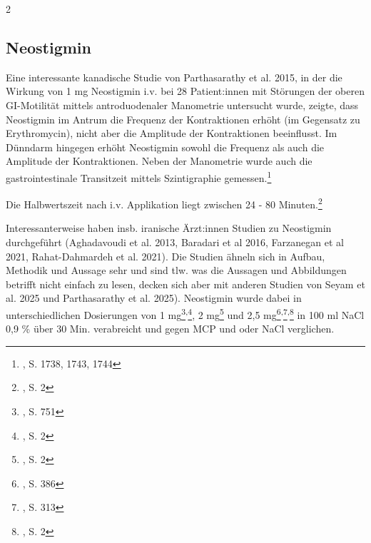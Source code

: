 \documentclass{article}
\begin{document}
\begin{multicols}{2}

  \subsection{Neostigmin}%
  \label{sub:Neostigmin}

  Eine interessante kanadische Studie von Parthasarathy et al. 2015, in der die Wirkung von 1 mg Neostigmin i.v. bei 28 Patient:innen mit Störungen der oberen GI-Motilität mittels antroduodenaler Manometrie untersucht wurde, zeigte, dass Neostigmin im Antrum die Frequenz der Kontraktionen erhöht (im Gegensatz zu Erythromycin), nicht aber die Amplitude der Kontraktionen beeinflusst. Im Dünndarm hingegen erhöht Neostigmin sowohl die Frequenz als auch die Amplitude der Kontraktionen. Neben der Manometrie wurde auch die gastrointestinale Transitzeit mittels Szintigraphie gemessen.\footnote{\cite{parthasarathy2015EffectNeostigmineGastroduodenal}, S. 1738, 1743, 1744}

  Die Halbwertszeit nach i.v. Applikation liegt zwischen 24 - 80 Minuten.\footnote{\cite{NeostigCarinopharm05Mga}, S. 2}

  Interessanterweise haben insb. iranische Ärzt:innen Studien zu Neostigmin durchgeführt (Aghadavoudi et al. 2013, Baradari et al 2016, Farzanegan et al 2021, Rahat-Dahmardeh et al. 2021). Die Studien ähneln sich in Aufbau, Methodik und Aussage sehr und sind tlw. was die Aussagen und Abbildungen betrifft nicht einfach zu lesen, decken sich aber mit anderen Studien von Seyam et al. 2025 und Parthasarathy et al. 2025).
  Neostigmin wurde dabei in unterschiedlichen Dosierungen von 1 mg\footnote{\cite{aghadavoudi2013EvaluationIntravenousNeostigmine}, S. 751}\textsuperscript{,}\footnote{\cite{seyam2025EffectTwoDifferent}, S. 2}, 2 mg\footnote{\cite{seyam2025EffectTwoDifferent}, S. 2} und 2,5 mg\footnote{\cite{baradari2016DoubleblindRandomizedClinical}, S. 386}\textsuperscript{,}\footnote{\cite{farzanegan2021MeasurementGastricResidual}, S. 313}\textsuperscript{,}\footnote{\cite{rahat-dahmardeh2021ComparingEffectNeostigmine}, S. 2} in 100 ml NaCl 0,9 \% über 30 Min. verabreicht und gegen MCP und oder NaCl verglichen. 


\end{multicols}
\end{document}
